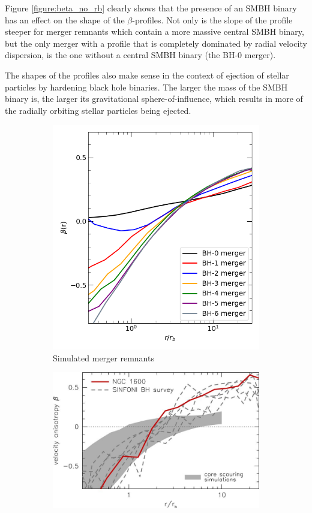 \documentclass[english, oneside]{HYgradu}
\begin{document}
Figure \ref{figure:beta_no_rb} clearly shows that the presence of an SMBH binary has an effect on the shape of the $\beta$-profiles. Not only is the slope of the profile steeper for merger remnants which contain a more massive central SMBH binary, but the only merger with a profile that is completely dominated by radial velocity dispersion, is the one without a central SMBH binary (the BH-0 merger). 

The shapes of the profiles also make sense in the context of ejection of stellar particles by hardening black hole binaries. The larger the mass of the SMBH binary is, the larger its gravitational sphere-of-influence, which results in more of the radially orbiting stellar particles being ejected.

\begin{figure}
	\centering
	\begin{subfigure}[b]{0.39\textwidth}
		\includegraphics[width=\textwidth]{beta.png}	
		\caption{Simulated merger remnants}
	\end{subfigure}
	\begin{subfigure}[b]{0.60\textwidth}
		\includegraphics[width=\textwidth]{thomas2016.jpg}

\end{subfigure}
\end{figure}
\end{document}
